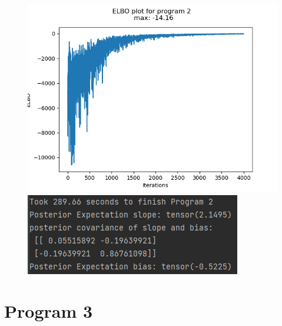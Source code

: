\documentclass[10pt]{homeworg}
\begin{document}
\begin{figure}[!htbp]
    \centering
    \begin{minipage}{0.45\textwidth}
        \centering
       \includegraphics[scale=0.5]{figures/elbo_program_2.png}
    \end{minipage}\hfill
    \begin{minipage}{0.45\textwidth}
        \centering
        \includegraphics[scale=0.8]{figures/program2_time.png}
    \end{minipage}
\end{figure}



\section{Program 3}


\end{document}

